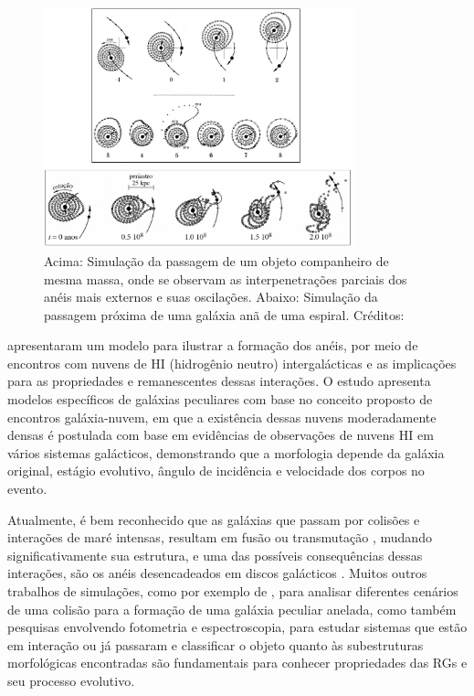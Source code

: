 \begin{figure}[h]
  \centering 
  \includegraphics[width=0.8\textwidth]{Imagens/tmtmsimu.png} 
  \caption[Simulação de partículas de teste.]{Acima: Simulação da passagem de um objeto companheiro de mesma massa, onde se observam as interpenetrações parciais dos anéis mais externos e suas oscilações. Abaixo: Simulação da passagem próxima de uma galáxia anã de uma espiral. Créditos: \cite{1972ApJ...178..623T}}
  \label{fig:simulacaotmtm} 
\end{figure}

 apresentaram um modelo para ilustrar a formação dos anéis, por meio de encontros com nuvens de HI (hidrogênio neutro) intergalácticas e as implicações para as propriedades e remanescentes dessas interações. O estudo apresenta modelos específicos de galáxias peculiares com base no conceito proposto de encontros galáxia-nuvem, em que a existência dessas nuvens moderadamente densas é postulada com base em evidências de observações de nuvens HI em vários sistemas galácticos, demonstrando que a morfologia depende da galáxia original, estágio evolutivo, ângulo de incidência e velocidade dos corpos no evento.

Atualmente, é bem reconhecido que as galáxias que passam por colisões e interações de maré intensas, resultam em fusão ou transmutação \cite{Appleton96, 2009madore}, mudando significativamente sua estrutura, e uma das possíveis consequências dessas interações, são os anéis desencadeados em discos galácticos \cite{2013A&A...558A..13F}. Muitos outros trabalhos de simulações, como por exemplo de , para analisar diferentes cenários de uma colisão para a formação de uma galáxia peculiar anelada, como também pesquisas envolvendo fotometria e espectroscopia, para estudar sistemas que estão em interação ou já passaram e classificar o objeto quanto às subestruturas morfológicas encontradas \cite{1999A&A...351..860M} são fundamentais para conhecer propriedades das RGs e seu processo evolutivo.

